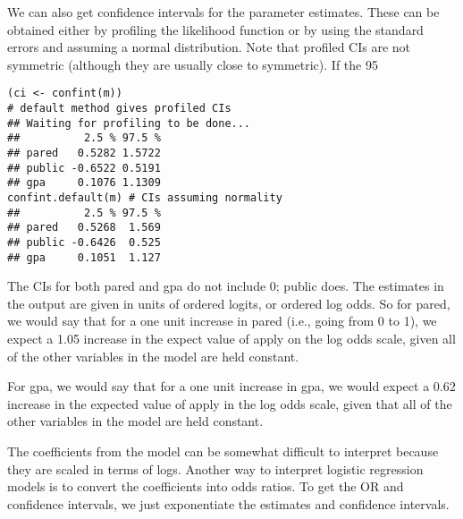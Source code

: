 \documentclass[00-GLMregslides.tex]{subfiles}
\begin{document}
	
\begin{frame}
	\Large
We can also get confidence intervals for the parameter estimates. These can be obtained either by profiling the likelihood function or by using the standard errors and assuming a normal distribution. Note that profiled CIs are not symmetric (although they are usually close to symmetric). If the 95%
\end{frame}
\begin{frame}[fragile]
	\begin{verbatim}
(ci <- confint(m)) 
# default method gives profiled CIs
## Waiting for profiling to be done...
##          2.5 % 97.5 %
## pared   0.5282 1.5722
## public -0.6522 0.5191
## gpa     0.1076 1.1309
confint.default(m) # CIs assuming normality
##          2.5 % 97.5 %
## pared   0.5268  1.569
## public -0.6426  0.525
## gpa     0.1051  1.127
\end{verbatim}
\end{frame}
\begin{frame}
The CIs for both pared and gpa do not include 0; public does. The estimates in the output are given in units of ordered logits, or ordered log odds. So for pared, we would say that for a one unit increase in pared (i.e., going from 0 to 1), we expect a 1.05 increase in the expect value of apply on the log odds scale, given all of the other variables in the model are held constant. 
\end{frame}
\begin{frame}
For gpa, we would say that for a one unit increase in gpa, we would expect a 0.62 increase in the expected value of apply in the log odds scale, given that all of the other variables in the model are held constant.
\end{frame}
\begin{frame}
The coefficients from the model can be somewhat difficult to interpret because they are scaled in terms of logs. Another way to interpret logistic regression models is to convert the coefficients into odds ratios. To get the OR and confidence intervals, we just exponentiate the estimates and confidence intervals.
\end{frame}
\end{document}

